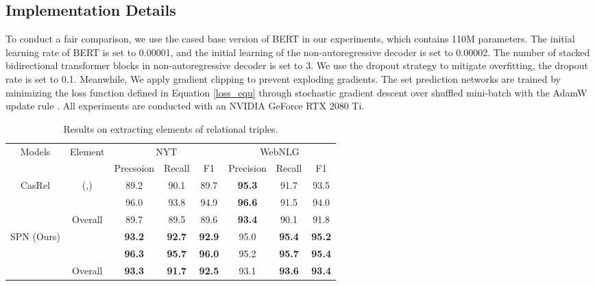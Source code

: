 \documentclass[letterpaper]{article} \usepackage{aaai21}  \usepackage{times}  \usepackage{helvet} \usepackage{courier}  \usepackage[hyphens]{url}  \usepackage{graphicx} \usepackage{amsfonts,amssymb}
\begin{document}
\subsection{Implementation Details}
To conduct a fair comparison, we use the cased base version of BERT in our experiments, which contains 110M parameters. The initial learning rate of BERT is set to 0.00001, and the initial learning of the non-autoregressive decoder is set to 0.00002. The number of stacked bidirectional transformer blocks in non-autoregressive decoder is set to 3. We use the dropout strategy to mitigate overfitting, the dropout rate is set to 0.1. Meanwhile, We apply gradient clipping to prevent exploding gradients. The set prediction networks are trained by minimizing the loss function defined in Equation \ref{loss_equ} through stochastic gradient descent over shuffled mini-batch with the AdamW update rule  \cite{loshchilov2017decoupled}. All experiments are conducted with an NVIDIA GeForce RTX 2080 Ti.

\begin{table*}[thbp]
\begin{center}
\begin{tabular}{c|c|ccc|ccc}
\hline
\multirow{2}{*}{Models}    & \multirow{2}{*}{Element} & \multicolumn{3}{c|}{NYT}   & \multicolumn{3}{c}{WebNLG} \\
\cline{3-8}
                           &                          & Precsoion & Recall & F1   & Precision  & Recall & F1   \\
                           \hline \hline
\multirow{3}{*}{CasRel \cite{wei-etal-2020-novel}}    & (,)                    & 89.2      & 90.1   & 89.7 & \textbf{95.3}       & 91.7   & 93.5 \\
                           &                         & 96.0     & 93.8   & 94.9 & \textbf{96.6}       & 91.5   & 94.0 \\
                           & Overall   & 89.7         & 89.5      & 89.6  &  \textbf{93.4}         & 90.1      & 91.8 \\
                           \hline
\multirow{3}{*}{SPN (Ours)} &                     & \textbf{93.2}      & \textbf{92.7}   & \textbf{92.9} & 95.0       & \textbf{95.4}   & \textbf{95.2} \\
                           &                         & \textbf{96.3}     & \textbf{95.7}   & \textbf{96.0} & 95.2       & \textbf{ 95.7}   & \textbf{95.4}\\
                           & Overall & \textbf{93.3}         & \textbf{91.7}      & \textbf{92.5} & 93.1         & \textbf{93.6}      & \textbf{93.4}\\
                           \hline
\end{tabular}
\end{center}
\caption{Results on extracting elements of relational triples.}
\label{detail_result}
\end{table*}
\end{document}
